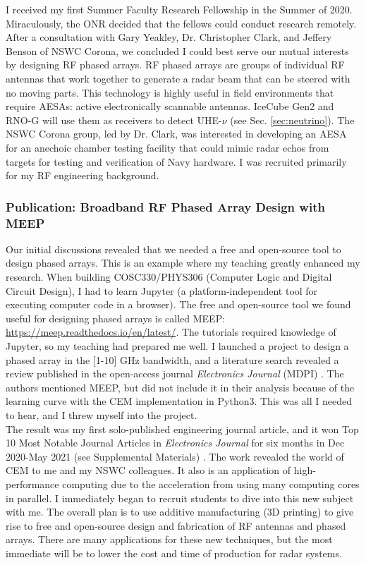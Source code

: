 \documentclass[../../../main.tex]{subfiles}
\begin{document}
I received my first Summer Faculty Research Fellowship in the Summer of 2020.  Miraculously, the ONR decided that the fellows could conduct research remotely.  After a consultation with Gary Yeakley, Dr. Christopher Clark, and Jeffery Benson of NSWC Corona, we concluded I could best serve our mutual interests by designing RF phased arrays.  RF phased arrays are groups of individual RF antennas that work together to generate a radar beam that can be steered with no moving parts.  This technology is highly useful in field environments that require AESAs: active electronically scannable antennas.  IceCube Gen2 and RNO-G will use them as receivers to detect UHE-$\nu$ (see Sec. \ref{sec:neutrino}).  The NSWC Corona group, led by Dr. Clark, was interested in developing an AESA for an anechoic chamber testing facility that could mimic radar echos from targets for testing and verification of Navy hardware.  I was recruited primarily for my RF engineering background.

\subsubsection{Publication: Broadband RF Phased Array Design with MEEP}

Our initial discussions revealed that we needed a free and open-source tool to design phased arrays.  This is an example where my teaching greatly enhanced my research.  When building COSC330/PHYS306 (Computer Logic and Digital Circuit Design), I had to learn Jupyter (a platform-independent tool for executing computer code in a browser).  The free and open-source tool we found useful for designing phased arrays is called MEEP: \url{https://meep.readthedocs.io/en/latest/}.  The tutorials required knowledge of Jupyter, so my teaching had prepared me well.  I launched a project to design a phased array in the [1-10] GHz bandwidth, and a literature search revealed a review published in the open-access journal \textit{Electronics Journal} (MDPI) \cite{10.3390/electronics8121506}.  The authors mentioned MEEP, but did not include it in their analysis because of the learning curve with the CEM implementation in Python3.  This was all I needed to hear, and I threw myself into the project.
\\
\vspace{0.25cm}
The result was my first solo-published engineering journal article, and it won Top 10 Most Notable Journal Articles in \textit{Electronics Journal} for six months in Dec 2020-May 2021 (see Supplemental Materials) \cite{electronics10040415}.  The work revealed the world of CEM to me and my NSWC colleagues.  It also is an application of high-performance computing due to the acceleration from using many computing cores in parallel.  I immediately began to recruit students to dive into this new subject with me.  The overall plan is to use additive manufacturing (3D printing) to give rise to free and open-source design and fabrication of RF antennas and phased arrays.  There are many applications for these new techniques, but the most immediate will be to lower the cost and time of production for radar systems.
\end{document}
